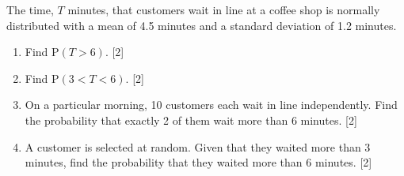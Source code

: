 \documentclass[12pt, twoside]{article}
\begin{document}
\begin{enumerate}[itemsep=0.15cm]
The time, $T$ minutes, that customers wait in line at a coffee shop
is normally distributed with a mean of 4.5 minutes and a standard deviation
of 1.2 minutes.

\begin{enumerate}[itemsep=0.25cm]
  \item[(a)] Find $\mathrm{P}(T > 6)$. \hfill [2]
  \item[(b)] Find $\mathrm{P}(3 < T < 6)$. \hfill [2]
  \item[(c)] On a particular morning, 10 customers each wait in line independently.
  Find the probability that exactly 2 of them wait more than 6 minutes. \hfill [2]
  \item[(d)] A customer is selected at random. Given that they waited more than
  3 minutes, find the probability that they waited more than 6 minutes. \hfill [2]
\end{enumerate}


\end{enumerate}
\end{document}
